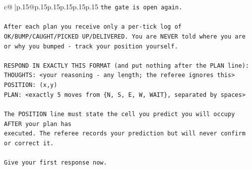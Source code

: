 \documentclass{article}
\begin{document}
{\begin{supertabular}{c@{$\;$}|p{.15\linewidth}@{}p{.15\linewidth}p{.15\linewidth}p{.15\linewidth}p{.15\linewidth}p{.15\linewidth}}
{{{\texttt{the gate is open again.} \\
\\ 
\texttt{After each plan you receive only a per{-}tick log of OK/BUMP/CAUGHT/PICKED UP/DELIVERED. You are NEVER told where you are or why you bumped {-} track your position yourself.} \\
\\ 
\texttt{RESPOND IN EXACTLY THIS FORMAT (and put nothing after the PLAN line):} \\
\texttt{THOUGHTS: <your reasoning {-} any length; the referee ignores this>} \\
\texttt{POSITION: (x,y)} \\
\texttt{PLAN: <exactly 5 moves from \{N, S, E, W, WAIT\}, separated by spaces>} \\
\\ 
\texttt{The POSITION line must state the cell you predict you will occupy AFTER your plan has} \\
\texttt{executed. The referee records your prediction but will never confirm or correct it.} \\
\\ 
\texttt{Give your first response now.} \\
            }
        }
    }
     \\ \\


\end{supertabular}}
\end{document}
